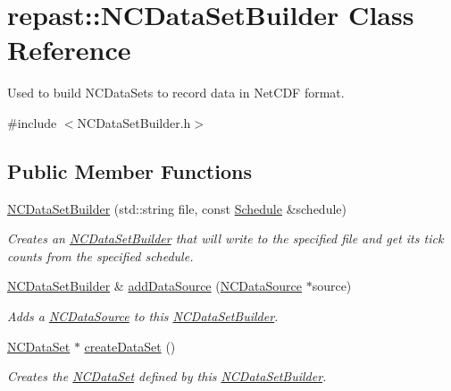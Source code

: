 \hypertarget{classrepast_1_1_n_c_data_set_builder}{\section{repast\-:\-:N\-C\-Data\-Set\-Builder Class Reference}
\label{classrepast_1_1_n_c_data_set_builder}
}


Used to build N\-C\-Data\-Sets to record data in Net\-C\-D\-F format.  




{\ttfamily \#include $<$N\-C\-Data\-Set\-Builder.\-h$>$}

\subsection*{Public Member Functions}
\begin{DoxyCompactItemize}
\item 
\hyperlink{classrepast_1_1_n_c_data_set_builder_a59f6a34ad2c29c55d9d817e1ad24434c}{N\-C\-Data\-Set\-Builder} (std\-::string file, const \hyperlink{classrepast_1_1_schedule}{Schedule} \&schedule)
\begin{DoxyCompactList}\small\item\em Creates an \hyperlink{classrepast_1_1_n_c_data_set_builder}{N\-C\-Data\-Set\-Builder} that will write to the specified file and get its tick counts from the specified schedule. \end{DoxyCompactList}\item 
\hyperlink{classrepast_1_1_n_c_data_set_builder}{N\-C\-Data\-Set\-Builder} \& \hyperlink{classrepast_1_1_n_c_data_set_builder_aafe67957e9e7fd5eb306c351a7f28c54}{add\-Data\-Source} (\hyperlink{classrepast_1_1_n_c_data_source}{N\-C\-Data\-Source} $\ast$source)
\begin{DoxyCompactList}\small\item\em Adds a \hyperlink{classrepast_1_1_n_c_data_source}{N\-C\-Data\-Source} to this \hyperlink{classrepast_1_1_n_c_data_set_builder}{N\-C\-Data\-Set\-Builder}. \end{DoxyCompactList}\item 
\hyperlink{classrepast_1_1_n_c_data_set}{N\-C\-Data\-Set} $\ast$ \hyperlink{classrepast_1_1_n_c_data_set_builder_a6674abbc1f28e0141a6f59a618fd0e62}{create\-Data\-Set} ()
\begin{DoxyCompactList}\small\item\em Creates the \hyperlink{classrepast_1_1_n_c_data_set}{N\-C\-Data\-Set} defined by this \hyperlink{classrepast_1_1_n_c_data_set_builder}{N\-C\-Data\-Set\-Builder}. \end{DoxyCompactList}\end{DoxyCompactItemize}



